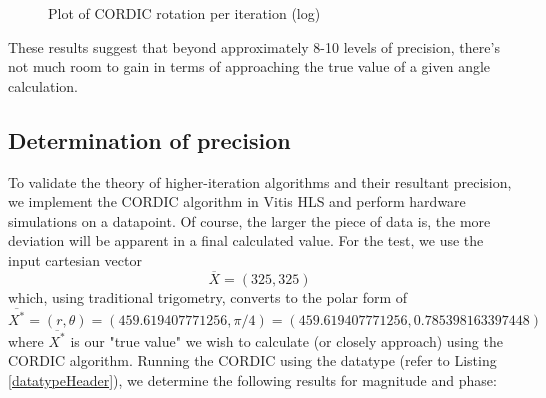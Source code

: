 \documentclass[../report_polarFIR.tex]{subfiles}
\begin{document}
\begin{figure}[h!]
\begin{center}
   \caption{Plot of CORDIC rotation per iteration (log)}
\end{center}
\end{figure}
\FloatBarrier

These results suggest that beyond approximately 8-10 levels of precision, there's not much room to gain in terms of approaching the true value of a given angle calculation. 

\subsection{Determination of precision}

To validate the theory of higher-iteration algorithms and their resultant precision, we implement the CORDIC algorithm in Vitis HLS and perform hardware simulations on a datapoint. Of course, the larger the piece of data is, the more deviation will be apparent in a final calculated value. For the test, we use the input cartesian vector
\begin{equation}
	\overline X = (325, 325)
\end{equation}
which, using traditional trigometry, converts to the polar form of
\begin{equation}
	\overline {X^*} = (r, \theta) = (459.619407771256, \pi / 4) = (459.619407771256, 0.785398163397448)
\end{equation}
where $\overline {X^*}$ is our "true value" we wish to calculate (or closely approach) using the CORDIC algorithm. Running the CORDIC using the datatype  (refer to Listing \ref{datatypeHeader}), we determine the following results for magnitude and phase:
\end{document}
